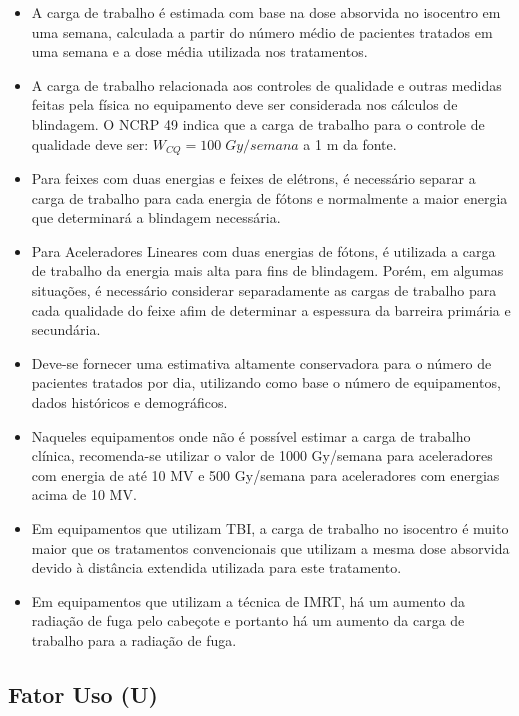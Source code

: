 \documentclass[11pt,a4paper]{article}
\begin{document}
\begin{itemize}
                \item A carga de trabalho é estimada com base na dose absorvida no isocentro em uma semana, calculada a partir do número médio de pacientes tratados em uma semana e a dose média utilizada nos tratamentos. 
                \item A carga de trabalho relacionada aos controles de qualidade e outras medidas feitas pela física no equipamento deve ser considerada nos cálculos de blindagem. O NCRP 49 indica que a carga de trabalho para o controle de qualidade deve ser: $W_{CQ} = 100 \; Gy/semana$ a 1 m da fonte.
                \item Para feixes com duas energias e feixes de elétrons, é necessário separar a carga de trabalho para cada energia de fótons e normalmente a maior energia que determinará a blindagem necessária.
                \item Para Aceleradores Lineares com duas energias de fótons, é utilizada a carga de trabalho da energia mais alta para fins de blindagem. Porém, em algumas situações, é necessário considerar separadamente as cargas de trabalho para cada qualidade do feixe afim de determinar a espessura da barreira primária e secundária.
                \item Deve-se fornecer uma estimativa altamente conservadora para o número de pacientes tratados por dia, utilizando como base o número de equipamentos, dados históricos e demográficos.
                \item Naqueles equipamentos onde não é possível estimar a carga de trabalho clínica, recomenda-se utilizar o valor de 1000 Gy/semana para aceleradores com energia de até 10 MV e 500 Gy/semana para aceleradores com energias acima de 10 MV.
                \item Em equipamentos que utilizam TBI, a carga de trabalho no isocentro é muito maior que os tratamentos convencionais que utilizam a mesma dose absorvida devido à distância extendida utilizada para este tratamento.
                
                \item Em equipamentos que utilizam a técnica de IMRT, há um aumento da radiação de fuga pelo cabeçote e portanto há um aumento da carga de trabalho para a radiação de fuga.
            \end{itemize}

        \subsection*{\textcolor{CarnationPink}{Fator Uso (U)}}
\end{document}
